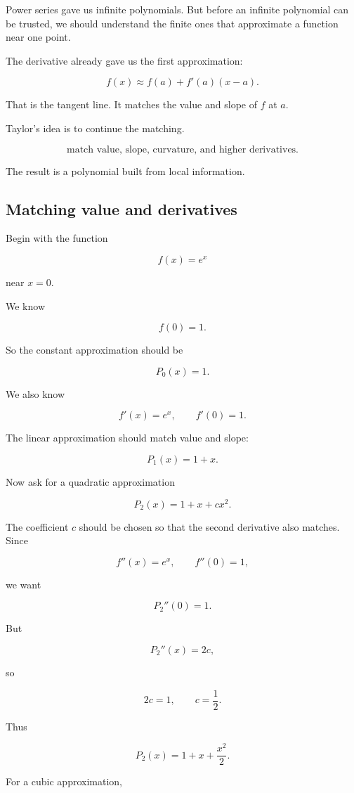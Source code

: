Power series gave us infinite polynomials.  But before an infinite polynomial can be
trusted, we should understand the finite ones that approximate a function near one
point.

The derivative already gave us the first approximation:

\[
f(x)\approx f(a)+f'(a)(x-a).
\]

That is the tangent line.  It matches the value and slope of \(f\) at \(a\).

Taylor's idea is to continue the matching.

\[
\text{match value, slope, curvature, and higher derivatives.}
\]

The result is a polynomial built from local information.

\subsection{Matching value and derivatives}
\label{subsec:matching-value-and-derivatives}

Begin with the function

\[
f(x)=e^x
\]

near \(x=0\).

We know

\[
f(0)=1.
\]

So the constant approximation should be

\[
P_0(x)=1.
\]

We also know

\[
f'(x)=e^x,
\qquad
f'(0)=1.
\]

The linear approximation should match value and slope:

\[
P_1(x)=1+x.
\]

Now ask for a quadratic approximation

\[
P_2(x)=1+x+cx^2.
\]

The coefficient \(c\) should be chosen so that the second derivative also matches.
Since

\[
f''(x)=e^x,
\qquad
f''(0)=1,
\]

we want

\[
P_2''(0)=1.
\]

But

\[
P_2''(x)=2c,
\]

so

\[
2c=1,
\qquad
c=\frac12.
\]

Thus

\[
P_2(x)=1+x+\frac{x^2}{2}.
\]

For a cubic approximation,

